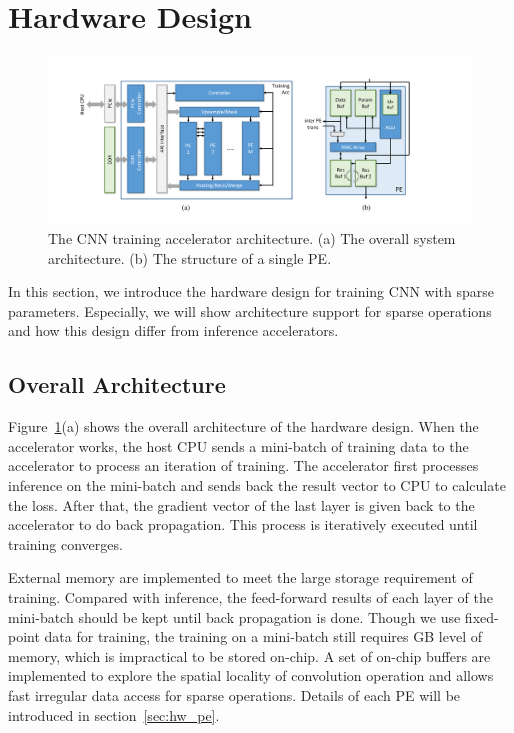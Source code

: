 \section{Hardware Design}\label{sec:hw}

\begin{figure}[t]
  \centering
  \includegraphics[width=2\columnwidth]{figures/architecture.pdf}
  \caption{The CNN training accelerator architecture. (a) The overall system architecture. (b) The structure of a single PE. }
  \label{fig:arch}
\end{figure}

In this section, we introduce the hardware design for training CNN with sparse parameters. Especially, we will show architecture support for sparse operations and how this design differ from inference accelerators.

\subsection{Overall Architecture}
Figure~\ref{fig:arch}(a) shows the overall architecture of the hardware design. 
When the accelerator works, the host CPU sends a mini-batch of training data to the accelerator to process an iteration of training. The accelerator first processes inference on the mini-batch and sends back the result vector to CPU to calculate the loss. After that, the gradient vector of the last layer is given back to the accelerator to do back propagation. This process is iteratively executed until training converges.

External memory are implemented to meet the large storage requirement of training. Compared with inference, the feed-forward results of each layer of the mini-batch should be kept until back propagation is done. Though we use fixed-point data for training, the training on a mini-batch still requires GB level of memory, which is impractical to be stored on-chip. A set of on-chip buffers are implemented to explore the spatial locality of convolution operation and allows fast irregular data access for sparse operations. Details of each PE will be introduced in section~\ref{sec:hw_pe}.

